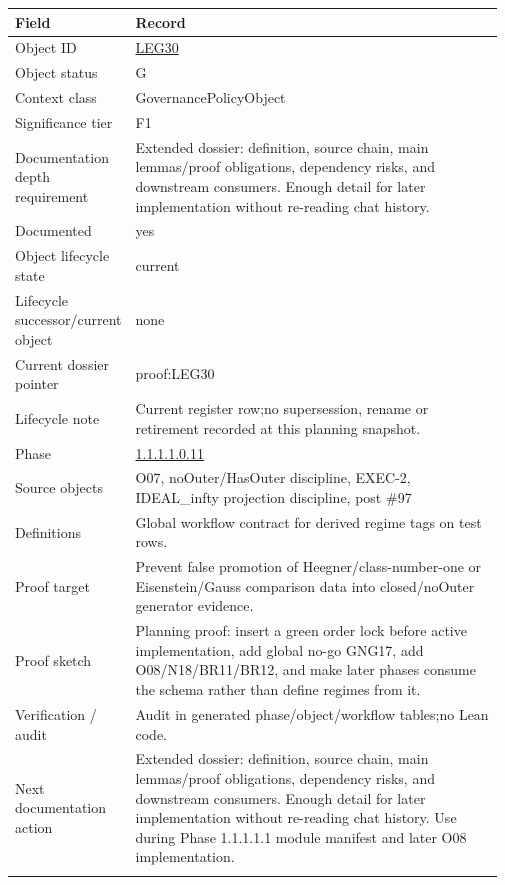 \begin{longtable}{L{0.16\linewidth} L{0.81\linewidth}}
\hline
\textbf{Field} & \textbf{Record}\\
\hline
Object ID & \hyperlink{object-row-LEG30}{LEG30}\\
\hline\addlinespace[0.20em]
Object status & G\\
\hline\addlinespace[0.20em]
Context class & GovernancePolicyObject\\
\hline\addlinespace[0.20em]
Significance tier & F1\\
\hline\addlinespace[0.20em]
Documentation depth requirement & Extended dossier: definition, source chain, main lemmas/\allowbreak{}proof obligations, dependency risks, and downstream consumers. Enough detail for later implementation without re-reading chat history.\\
\hline\addlinespace[0.20em]
Documented & yes\\
\hline\addlinespace[0.20em]
Object lifecycle state & current\\
\hline\addlinespace[0.20em]
Lifecycle successor/\allowbreak{}current object & none\\
\hline\addlinespace[0.20em]
Current dossier pointer & proof:LEG30\\
\hline\addlinespace[0.20em]
Lifecycle note & Current register row;\newline no supersession, rename or retirement recorded at this planning snapshot.\\
\hline\addlinespace[0.20em]
Phase & \hyperlink{phase-row-1-1-1-1-0-11}{1.1.1.1.0.11}\\
\hline\addlinespace[0.20em]
Source objects & O07, noOuter/\allowbreak{}HasOuter discipline, EXEC-2, IDEAL\_infty projection discipline, post \#97\\
\hline\addlinespace[0.20em]
Definitions & Global workflow contract for derived regime tags on test rows.\\
\hline\addlinespace[0.20em]
Proof target & Prevent false promotion of Heegner/\allowbreak{}class-number-one or Eisenstein/\allowbreak{}Gauss comparison data into closed/\allowbreak{}noOuter generator evidence.\\
\hline\addlinespace[0.20em]
Proof sketch & Planning proof: insert a green order lock before active implementation, add global no-go GNG17, add O08/\allowbreak{}N18/\allowbreak{}BR11/\allowbreak{}BR12, and make later phases consume the schema rather than define regimes from it.\\
\hline\addlinespace[0.20em]
Verification /\allowbreak{} audit & Audit in generated phase/\allowbreak{}object/\allowbreak{}workflow tables;\newline no Lean code.\\
\hline\addlinespace[0.20em]
Next documentation action & Extended dossier: definition, source chain, main lemmas/\allowbreak{}proof obligations, dependency risks, and downstream consumers. Enough detail for later implementation without re-reading chat history. Use during Phase 1.1.1.1.1 module manifest and later O08 implementation.\\
\hline\addlinespace[0.20em]
\end{longtable}
